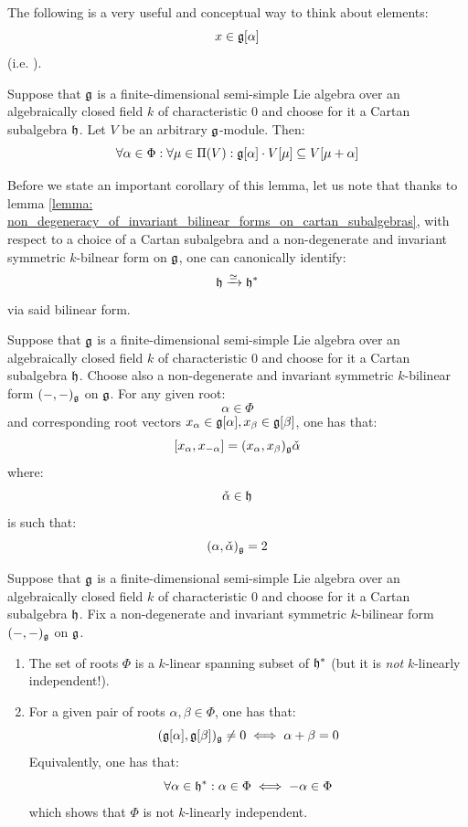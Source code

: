         The following is a very useful and conceptual way to think about elements:
            $$x \in \mathfrak{g}[\alpha]$$
        (i.e. ). 
        \begin{lemma}
            Suppose that $\mathfrak{g}$ is a finite-dimensional semi-simple Lie algebra over an algebraically closed field $k$ of characteristic $0$ and choose for it a Cartan subalgebra $\mathfrak{h}$. Let $V$ be an arbitrary $\mathfrak{g}$-module. Then:
                $$\forall \alpha \in \Phi: \forall \mu \in \Pi(V): \mathfrak{g}[\alpha] \cdot V[\mu] \subseteq V[\mu + \alpha]$$
        \end{lemma}
        Before we state an important corollary of this lemma, let us note that thanks to lemma \ref{lemma: non_degeneracy_of_invariant_bilinear_forms_on_cartan_subalgebras}, with respect to a choice of a Cartan subalgebra and a non-degenerate and invariant symmetric $k$-bilnear form on $\mathfrak{g}$, one can canonically identify:
            $$\mathfrak{h} \xrightarrow[]{\simeq} \mathfrak{h}^*$$
        via said bilinear form. 
        \begin{corollary}
            Suppose that $\mathfrak{g}$ is a finite-dimensional semi-simple Lie algebra over an algebraically closed field $k$ of characteristic $0$ and choose for it a Cartan subalgebra $\mathfrak{h}$. Choose also a non-degenerate and invariant symmetric $k$-bilinear form $(-, -)_{\mathfrak{g}}$ on $\mathfrak{g}$. For any given root:
                $$\alpha \in \Phi$$
            and corresponding root vectors $x_{\alpha} \in \mathfrak{g}[\alpha], x_{\beta} \in \mathfrak{g}[\beta]$, one has that:
                $$[x_{\alpha}, x_{-\alpha}] = (x_{\alpha}, x_{\beta})_{\mathfrak{g}} \check{\alpha}$$
            where:
                $$\check{\alpha} \in \mathfrak{h}$$
            is such that:
                $$(\alpha, \check{\alpha})_{\mathfrak{g}} = 2$$
        \end{corollary}
        \begin{proposition}
            Suppose that $\mathfrak{g}$ is a finite-dimensional semi-simple Lie algebra over an algebraically closed field $k$ of characteristic $0$ and choose for it a Cartan subalgebra $\mathfrak{h}$. Fix a non-degenerate and invariant symmetric $k$-bilinear form $(-, -)_{\mathfrak{g}}$ on $\mathfrak{g}$.
            \begin{enumerate}
                \item The set of roots $\Phi$ is a $k$-linear spanning subset of $\mathfrak{h}^*$ (but it is \textit{not} $k$-linearly independent!).
                \item For a given pair of roots $\alpha, \beta \in \Phi$, one has that:
                    $$(\mathfrak{g}[\alpha], \mathfrak{g}[\beta])_{\mathfrak{g}} \not = 0 \iff \alpha + \beta = 0$$
                Equivalently, one has that:
                    $$\forall \alpha \in \mathfrak{h}^*: \alpha \in \Phi \iff -\alpha \in \Phi$$
                which shows that $\Phi$ is not $k$-linearly independent.
            \end{enumerate}
        \end{proposition}
